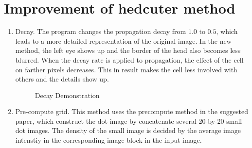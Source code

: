 \documentclass[11pt]{article}
\begin{document}
\section{Improvement of hedcuter method}
\begin{enumerate}
  \item Decay. The program changes the propagation decay from $1.0$ to $0.5$, which leads to a more detailed representation of the original image. In the new method, the left eye shows up and the border of the head also becomes less blurred. When the decay rate is applied to propagation, the effect of the cell on farther pixels decreases. This in result makes the cell less involved with others and the details show up.
  \begin{figure}[h!]
      \centering
      \qquad
      \qquad
      \caption{Decay Demonstration}
      \label{fig:Liang-decay}
  \end{figure}
  \item Pre-compute grid. This method uses the precompute method in the suggested paper, which construct the dot image by concatenate several 20-by-20 small dot images. The density of the small image is decided by the average image intenstiy in the corresponding image block in the input image.

\end{enumerate}
\end{document}
